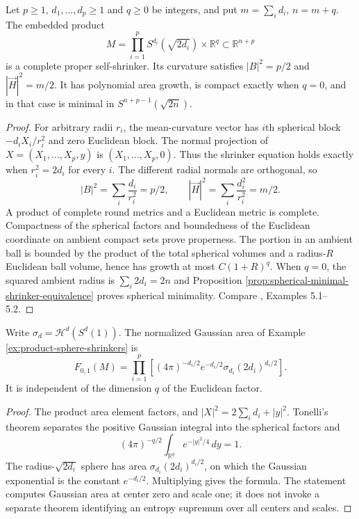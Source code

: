 \begin{example}\label{ex:product-sphere-shrinkers}
Let $p\geq1$, $d_1,\ldots,d_p\geq1$ and $q\geq0$ be integers, and put $m=\sum_i d_i$, $n=m+q$. The embedded product
\[
 M=\prod_{i=1}^p S^{d_i}(\sqrt{2d_i})\times\mathbb R^q\subset\mathbb R^{n+p}
\]
is a complete proper self-shrinker. Its curvature satisfies $|B|^2=p/2$ and $|\vec H|^2=m/2$. It has polynomial area growth, is compact exactly when $q=0$, and in that case is minimal in $S^{n+p-1}(\sqrt{2n})$.
\end{example}
\begin{proof}
For arbitrary radii $r_i$, the mean-curvature vector has $i$th spherical block $-d_iX_i/r_i^2$ and zero Euclidean block. The normal projection of $X=(X_1,\ldots,X_p,y)$ is $(X_1,\ldots,X_p,0)$. Thus the shrinker equation holds exactly when $r_i^2=2d_i$ for every $i$. The different radial normals are orthogonal, so
\[
 |B|^2=\sum_i\frac{d_i}{r_i^2}=p/2,
 \qquad |\vec H|^2=\sum_i\frac{d_i^2}{r_i^2}=m/2.
\]
A product of complete round metrics and a Euclidean metric is complete. Compactness of the spherical factors and boundedness of the Euclidean coordinate on ambient compact sets prove properness. The portion in an ambient ball is bounded by the product of the total spherical volumes and a radius-$R$ Euclidean ball volume, hence has growth at most $C(1+R)^q$. When $q=0$, the squared ambient radius is $\sum_i2d_i=2n$ and Proposition \ref{prop:spherical-minimal-shrinker-equivalence} proves spherical minimality. Compare \cite{CL12}, Examples 5.1--5.2.
\end{proof}

\begin{proposition}\label{prop:product-shrinker-gaussian-area}
Write $\sigma_d=\mathcal H^d(S^d(1))$. The normalized Gaussian area of Example \ref{ex:product-sphere-shrinkers} is
\[
 F_{0,1}(M)=\prod_{i=1}^p\left[(4\pi)^{-d_i/2}e^{-d_i/2}\sigma_{d_i}(2d_i)^{d_i/2}\right].
\]
It is independent of the dimension $q$ of the Euclidean factor.
\end{proposition}
\begin{proof}
The product area element factors, and $|X|^2=2\sum_i d_i+|y|^2$. Tonelli's theorem separates the positive Gaussian integral into the spherical factors and
\[
 (4\pi)^{-q/2}\int_{\mathbb R^q}e^{-|y|^2/4}\,dy=1.
\]
The radius-$\sqrt{2d_i}$ sphere has area $\sigma_{d_i}(2d_i)^{d_i/2}$, on which the Gaussian exponential is the constant $e^{-d_i/2}$. Multiplying gives the formula. The statement computes Gaussian area at center zero and scale one; it does not invoke a separate theorem identifying an entropy supremum over all centers and scales.
\end{proof}

